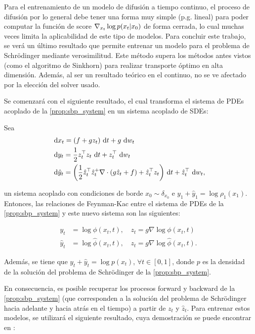 Para el entrenamiento de un modelo de difusión a tiempo continuo, el proceso de difusión por lo general debe tener una forma muy simple (p.g. lineal) para poder computar la función de score $\nabla_{x_t} \log p(x_t|x_0)$ de forma cerrada, lo cual muchas veces limita la aplicabilidad de este tipo de modelos. Para concluir este trabajo, se verá un último resultado que permite entrenar un modelo para el problema de Schrödinger mediante verosimilitud. Este método supera los métodos antes vistos (como el algoritmo de Sinkhorn) para realizar transporte óptimo en alta dimensión. Además, al ser un resultado teórico en el continuo, no se ve afectado por la elección del solver usado.

Se comenzará con el siguiente resultado, el cual transforma el sistema de PDEs acoplado de la \autoref{prop:sbp_system} en un sistema acoplado de SDEs:

\begin{teo}
	\label{teo:feynman_kac_sbp}

	Sea
	\begin{align*}
		&\d x_t = (f+gz_t)\d t + g\d w_t\\
		&\d y_t = \frac{1}{2} z_t^\top z_t \d t + z_t^\top \d w_t\\
		&\d \hat y_t = \parent{\frac{1}{2}\hat z_t^\top \hat z_t^ + \nabla\cdot(g\hat z_t + f) + \hat z_t^\top z_t}\d t + \hat z_t^\top \d w_t,
	\end{align*}

	un sistema acoplado con condiciones de borde $x_0\sim\delta_{x_0}$ e $y_1+\hat y_1 = \log \rho_1(x_1)$. Entonces, las relaciones de Feynman-Kac entre el sistema de PDEs de la \autoref{prop:sbp_system} y este nuevo sistema son las siguientes:

	\begin{align*}
		y_t &= \log \phi(x_t,t),\quad z_t = g\nabla\log\phi(x_t,t)\\
		\hat y_t &= \log \hat\phi(x_t,t),\quad \hat z_t = g\nabla\log\hat\phi(x_t,t).
	\end{align*}

	Además, se tiene que $y_t + \hat y_t = \log p(x_t)$, $\forall t\in[0,1]$, donde $p$ es la densidad de la solución del problema de Schrödinger de la \autoref{prop:sbp_system}.
	
\end{teo}

En consecuencia, es posible recuperar los procesos forward y backward de la \autoref{prop:sbp_system} (que corresponden a la solución del problema de Schrödinger hacia adelante y hacia atrás en el tiempo) a partir de $z_t$ y $\hat z_t$. Para entrenar estos modelos, se utilizará el siguiente resultado, cuya demostración se puede encontrar en \cite{chen2023likelihoodtrainingschrodingerbridge}:


